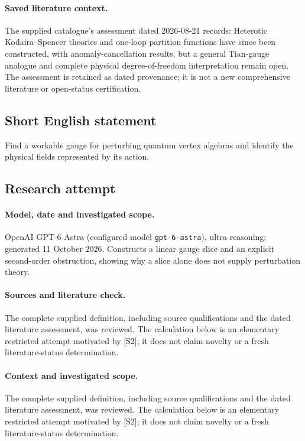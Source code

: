\documentclass[11pt]{article}
\begin{document}
\paragraph{Saved literature context.} The supplied catalogue's assessment dated 2026-08-21 records: Heterotic Kodaira--Spencer theories and one-loop partition functions have since been constructed, with anomaly-cancellation results, but a general Tian-gauge analogue and complete physical degree-of-freedom interpretation remain open. The assessment is retained as dated provenance; it is not a new comprehensive literature or open-status certification.
\subsection{Short English statement}
Find a workable gauge for perturbing quantum vertex algebras and identify the physical fields represented by its action.
\subsection{Research attempt}
\paragraph{Model, date and investigated scope.}
OpenAI GPT-6 Astra (configured model \texttt{gpt-6-astra}), ultra reasoning; generated 11 October 2026. Constructs a linear gauge slice and an explicit second-order obstruction, showing why a slice alone does not supply perturbation theory.

\paragraph{Sources and literature check.}
The complete supplied definition, including source qualifications and the dated literature assessment, was reviewed. The calculation below is an elementary restricted attempt motivated by [S2]; it does not claim novelty or a fresh literature-status determination.

\paragraph{Context and investigated scope.} The complete supplied definition, including source qualifications and the dated literature assessment, was reviewed. The calculation below is an elementary restricted attempt motivated by [S2]; it does not claim novelty or a fresh literature-status determination.
\end{document}
